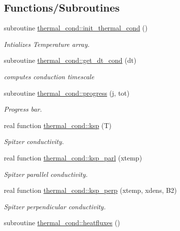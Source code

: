 \subsection*{Functions/\+Subroutines}
\begin{DoxyCompactItemize}
\item 
subroutine \hyperlink{namespacethermal__cond_ac611766519a4602033c83e3ed5ae3c00}{thermal\+\_\+cond\+::init\+\_\+thermal\+\_\+cond} ()
\begin{DoxyCompactList}\small\item\em Intializes Temperature array. \end{DoxyCompactList}\item 
subroutine \hyperlink{namespacethermal__cond_a074d4829b3477fa8003983819e77523d}{thermal\+\_\+cond\+::get\+\_\+dt\+\_\+cond} (dt)
\begin{DoxyCompactList}\small\item\em computes conduction timescale \end{DoxyCompactList}\item 
subroutine \hyperlink{namespacethermal__cond_a5283f7a2b8b4a4226ce624fb49445f43}{thermal\+\_\+cond\+::progress} (j, tot)
\begin{DoxyCompactList}\small\item\em Progress bar. \end{DoxyCompactList}\item 
real function \hyperlink{namespacethermal__cond_ab3978fb62e485cf71d7c83e779e92615}{thermal\+\_\+cond\+::ksp} (T)
\begin{DoxyCompactList}\small\item\em Spitzer conductivity. \end{DoxyCompactList}\item 
real function \hyperlink{namespacethermal__cond_a8205274631d6cb4d36ffc0937aa88a74}{thermal\+\_\+cond\+::ksp\+\_\+parl} (xtemp)
\begin{DoxyCompactList}\small\item\em Spitzer parallel conductivity. \end{DoxyCompactList}\item 
real function \hyperlink{namespacethermal__cond_adfd8867a0fc7fe02a35a41000e36f9bf}{thermal\+\_\+cond\+::ksp\+\_\+perp} (xtemp, xdens, B2)
\begin{DoxyCompactList}\small\item\em Spitzer perpendicular conductivity. \end{DoxyCompactList}\item 
subroutine \hyperlink{namespacethermal__cond_abc5c4fc622aea2f85fc5a0c2fee333bc}{thermal\+\_\+cond\+::heatfluxes} ()

\end{DoxyCompactItemize}
